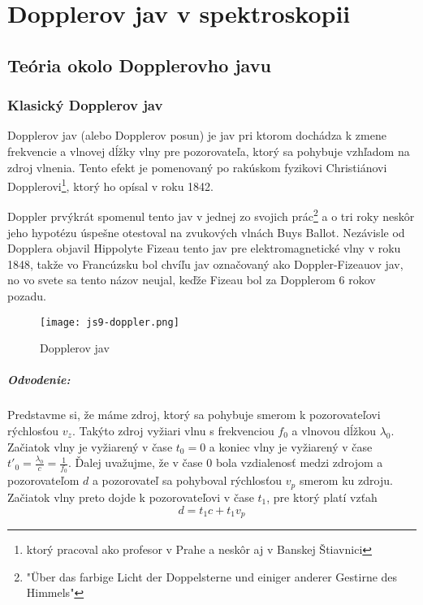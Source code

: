 \documentclass[../../main.tex]{subfiles}
\begin{document}
\chapter{Dopplerov jav v spektroskopii}

\section{Teória okolo Dopplerovho javu}

\subsection{Klasický Dopplerov jav}

Dopplerov jav (alebo Dopplerov posun) je jav pri ktorom dochádza k zmene frekvencie a vlnovej dĺžky vlny pre pozorovateľa, ktorý sa pohybuje vzhľadom na zdroj vlnenia. Tento efekt je pomenovaný po rakúskom fyzikovi Christiánovi Dopplerovi\footnote{ktorý pracoval ako profesor v Prahe a neskôr aj v Banskej Štiavnici}, ktorý ho opísal v roku 1842.

Doppler prvýkrát spomenul tento jav v jednej zo svojich prác\footnote{"Über das farbige Licht der Doppelsterne und einiger anderer Gestirne des Himmels"} a o tri roky neskôr jeho hypotézu úspešne otestoval na zvukových vlnách Buys Ballot. Nezávisle od Dopplera objavil Hippolyte Fizeau tento jav pre elektromagnetické vlny v roku 1848, takže vo Francúzsku bol chvíľu jav označovaný ako Doppler-Fizeauov jav, no vo svete sa tento názov neujal, keďže Fizeau bol za Dopplerom 6 rokov pozadu.

\begin{figure}[h]
\centering
\texttt{[image: js9-doppler.png]}
\caption{Dopplerov jav}
\label{js9:img:doppler}
\end{figure}


\paragraph{Odvodenie:} Predstavme si, že máme zdroj, ktorý sa pohybuje smerom k pozorovateľovi rýchlosťou $v_z$. Takýto zdroj vyžiari vlnu s frekvenciou $f_0$ a vlnovou dĺžkou $\lambda_0$. Začiatok vlny je vyžiarený v čase $t_0=0$ a koniec vlny je vyžiarený v čase $t'_0=\frac{\lambda_0}{c}=\frac{1}{f_0}$. Ďalej uvažujme, že v čase 0 bola vzdialenosť medzi zdrojom a pozorovateľom $d$ a pozorovateľ sa pohyboval rýchlosťou $v_p$ smerom ku zdroju. Začiatok vlny preto dojde k pozorovateľovi v čase $t_1$, pre ktorý platí vzťah
\begin{equation}
d=t_1 c+t_1 v_p
\end{equation}
\end{document}
